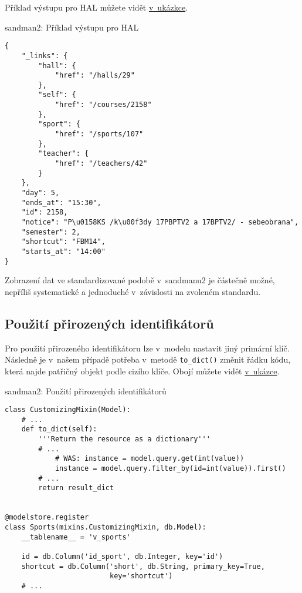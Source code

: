 Příklad výstupu pro HAL můžete vidět \protect\hyperlink{code:sandman2:hal}{v~ukázkce}.

\begin{listing}[htbp]
\caption{{\label{code:sandman2:hal}sandman2: Příklad výstupu pro HAL}}
\begin{verbatim}
{
    "_links": {
        "hall": {
            "href": "/halls/29"
        },
        "self": {
            "href": "/courses/2158"
        },
        "sport": {
            "href": "/sports/107"
        },
        "teacher": {
            "href": "/teachers/42"
        }
    },
    "day": 5,
    "ends_at": "15:30",
    "id": 2158,
    "notice": "P\u0158KS /k\u00f3dy 17PBPTV2 a 17BPTV2/ - sebeobrana",
    "semester": 2,
    "shortcut": "FBM14",
    "starts_at": "14:00"
}
\end{verbatim}
\end{listing}

Zobrazení dat ve standardizované podobě v~sandmanu2 je částečně možné, nepříliš systematické a jednoduché v~závislosti na zvoleném standardu.

\subsection{Použití přirozených identifikátorů}\label{pouux17eituxed-pux159irozenuxfdch-identifikuxe1torux16f}

Pro použití přirozeného identifikátoru lze v~modelu nastavit jiný primární klíč. Následně je v~našem případě potřeba v~metodě \verb!to_dict()! změnit řádku kódu, která najde patřičný objekt podle cizího klíče. Obojí můžete vidět \protect\hyperlink{code:sandman2:ids}{v~ukázce}.

\begin{listing}[htbp]
\caption{{\label{code:sandman2:ids}sandman2: Použití přirozených identifikátorů}}
\begin{verbatim}
class CustomizingMixin(Model):
    # ...
    def to_dict(self):
        '''Return the resource as a dictionary'''
        # ...
            # WAS: instance = model.query.get(int(value))
            instance = model.query.filter_by(id=int(value)).first()
        # ...
        return result_dict


@modelstore.register
class Sports(mixins.CustomizingMixin, db.Model):
    __tablename__ = 'v_sports'

    id = db.Column('id_sport', db.Integer, key='id')
    shortcut = db.Column('short', db.String, primary_key=True,
                         key='shortcut')
    # ...
\end{verbatim}
\end{listing}

